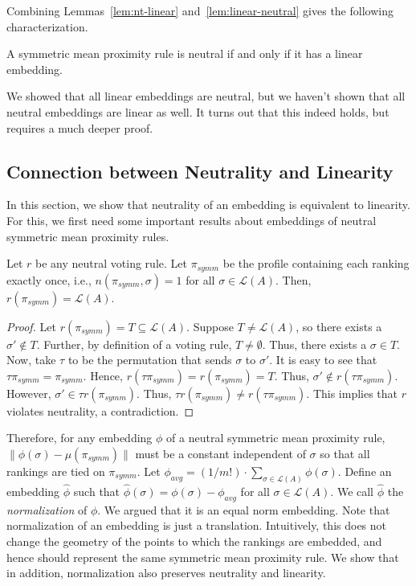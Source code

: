 \documentclass[prodmode,acmec]{ec-acmsmall}
\newcommand{\calL}{{\mathcal{L}}}
\newcommand{\rank}{{\calL(A)}}
\begin{document}
Combining Lemmas~\ref{lem:nt-linear} and~\ref{lem:linear-neutral} gives the following characterization.
\begin{theorem}
A symmetric mean proximity rule is neutral if and only if it has a linear embedding.
\label{thm:linear-char}
\end{theorem}

We showed that all linear embeddings are neutral, but we haven't shown that all neutral embeddings are linear as well. It turns out that this indeed holds, but requires a much deeper proof.

\subsection{Connection between Neutrality and Linearity}

In this section, we show that neutrality of an embedding is equivalent to linearity. For this, we first need some important results about embeddings of neutral symmetric mean proximity rules.

\begin{lemma}
Let $r$ be any neutral voting rule. Let $\pi_{symm}$ be the profile containing each ranking exactly once, i.e., $n(\pi_{symm},\sigma) = 1$ for all $\sigma \in \rank$. Then, $r(\pi_{symm}) = \rank$. 
\label{lem:average-profile}
\end{lemma}
\begin{proof}
Let $r(\pi_{symm}) = T \subseteq \rank$. Suppose $T \neq \rank$, so there exists a $\sigma' \notin T$. Further, by definition of a voting rule, $T \neq \emptyset$. Thus, there exists a $\sigma \in T$. Now, take $\tau$ to be the permutation that sends $\sigma$ to $\sigma'$. %
It is easy to see that $\tau \pi_{symm} = \pi_{symm}$. Hence, $r(\tau \pi_{symm}) = r(\pi_{symm}) = T$. Thus, $\sigma' \notin r(\tau \pi_{symm})$. However, $\sigma' \in \tau r(\pi_{symm})$. Thus, $\tau r(\pi_{symm}) \neq r(\tau \pi_{symm})$. This implies that $r$ violates neutrality, a contradiction. 
\end{proof}

Therefore, for any embedding $\phi$ of a neutral symmetric mean proximity rule, $\|\phi(\sigma)-\mu(\pi_{symm})\|$ must be a constant independent of $\sigma$ so that all rankings are tied on $\pi_{symm}$. Let $\phi_{avg} = (1/{m!}) \cdot \sum_{\sigma \in \rank} \phi(\sigma)$. Define an embedding $\hat{\phi}$  such that $\hat{\phi}(\sigma) = \phi(\sigma) - \phi_{avg}$ for all $\sigma \in \rank$. We call $\hat{\phi}$ the \emph{normalization} of $\phi$. We argued that it is an equal norm embedding. Note that normalization of an embedding is just a translation. Intuitively, this does not change the geometry of the points to which the rankings are embedded, and hence should represent the same symmetric mean proximity rule. We show that in addition, normalization also preserves neutrality and linearity. 
\end{document}
